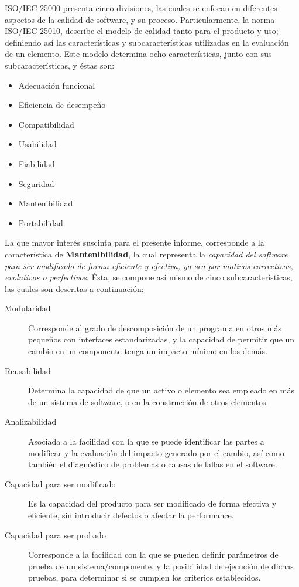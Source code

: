 ISO/IEC 25000 presenta cinco divisiones, las cuales se enfocan en diferentes aspectos
de la calidad de software, y su proceso.
Particularmente, la norma ISO/IEC 25010, describe el modelo de calidad tanto para el producto
y uso; definiendo así las características y subcaracterísticas utilizadas en la evaluación
de un elemento.
Este modelo determina ocho características, junto con sus subcaracterísticas, y éstas son:
\begin{itemize}
    \item Adecuación funcional
    \item Eficiencia de desempeño
    \item Compatibilidad
    \item Usabilidad
    \item Fiabilidad
    \item Seguridad
    \item Mantenibilidad
    \item Portabilidad
\end{itemize}

La que mayor interés suscinta para el presente informe, corresponde a la característica
de \textbf{Mantenibilidad}, la cual representa la \textit{capacidad del software para ser modificado
de forma eficiente y efectiva, ya sea por motivos correctivos, evolutivos o perfectivos}.
Ésta, se compone así mismo de cinco subcaracterísticas, las cuales son descritas
a continuación:
\begin{description}
    \item [Modularidad] Corresponde al grado de descomposición de un programa en otros más pequeños
    con interfaces estandarizadas, y la capacidad de permitir que un cambio en un componente tenga
    un impacto mínimo en los demás.
    \item [Reusabilidad] Determina la capacidad de que un activo o elemento sea empleado en más
    de un sistema de software, o en la construcción de otros elementos.
    \item [Analizabilidad] Asociada a la facilidad con la que se puede identificar las partes
    a modificar y la evaluación del impacto generado por el cambio, así como también el diagnóstico
    de problemas o causas de fallas en el software.
    \item [Capacidad para ser modificado] Es la capacidad del producto para ser modificado de
    forma efectiva y eficiente, sin introducir defectos o afectar la performance.
    \item [Capacidad para ser probado] Corresponde a la facilidad con la que se pueden definir
    parámetros de prueba de un sistema/componente, y la posibilidad de ejecución de dichas pruebas,
    para determinar si se cumplen los criterios establecidos.
\end{description}

